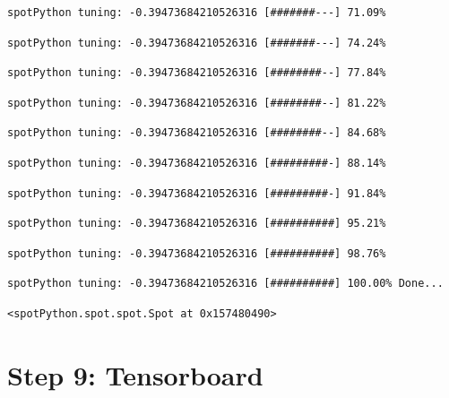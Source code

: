 \documentclass[
  letterpaper,
  DIV=11,
  numbers=noendperiod]{scrreprt}
\begin{document}
\begin{verbatim}
spotPython tuning: -0.39473684210526316 [#######---] 71.09% 
\end{verbatim}

\begin{verbatim}
spotPython tuning: -0.39473684210526316 [#######---] 74.24% 
\end{verbatim}

\begin{verbatim}
spotPython tuning: -0.39473684210526316 [########--] 77.84% 
\end{verbatim}

\begin{verbatim}
spotPython tuning: -0.39473684210526316 [########--] 81.22% 
\end{verbatim}

\begin{verbatim}
spotPython tuning: -0.39473684210526316 [########--] 84.68% 
\end{verbatim}

\begin{verbatim}
spotPython tuning: -0.39473684210526316 [#########-] 88.14% 
\end{verbatim}

\begin{verbatim}
spotPython tuning: -0.39473684210526316 [#########-] 91.84% 
\end{verbatim}

\begin{verbatim}
spotPython tuning: -0.39473684210526316 [##########] 95.21% 
\end{verbatim}

\begin{verbatim}
spotPython tuning: -0.39473684210526316 [##########] 98.76% 
\end{verbatim}

\begin{verbatim}
spotPython tuning: -0.39473684210526316 [##########] 100.00% Done...
\end{verbatim}

\begin{verbatim}
<spotPython.spot.spot.Spot at 0x157480490>
\end{verbatim}

\hypertarget{sec-tensorboard-18}{%
\section{Step 9: Tensorboard}\label{sec-tensorboard-18}}
\end{document}
